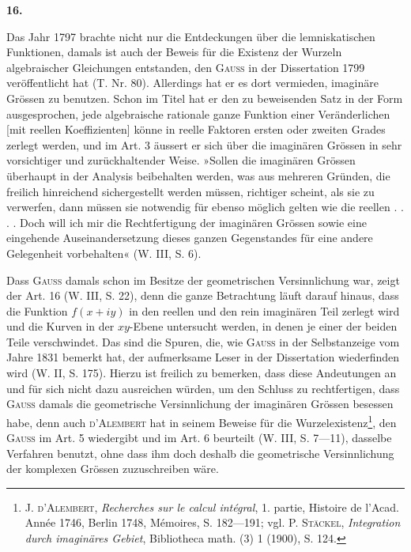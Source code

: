\clearpage\begingroup{}
\renewcommand{\thefootnote}{\arabic{footnote})}\setcounter{footnote}{0}
\begin{center}
\textbf{16.}\par\smallskip
{}
\end{center}
\noindent\hspace*{\parindent}Das Jahr 1797 brachte nicht nur die Entdeckungen über die lemniskatischen
Funktionen, damals ist auch der Beweis für die Existenz der Wurzeln
algebraischer Gleichungen entstanden, den \textsc{Gauss} in der Dissertation 1799
veröffentlicht hat (T. Nr. 80). Allerdings hat er es dort vermieden, imaginäre
Grössen zu benutzen. Schon im Titel hat er den zu beweisenden Satz in
der Form ausgesprochen, jede algebraische rationale ganze Funktion einer
Veränderlichen [mit reellen Koeffizienten] könne in reelle Faktoren ersten
oder zweiten Grades zerlegt werden, und im Art. 3 äussert er sich über die
imaginären Grössen in sehr vorsichtiger und zurückhaltender Weise. »Sollen
die imaginären Grössen überhaupt in der Analysis beibehalten werden, was
aus mehreren Gründen, die freilich hinreichend sichergestellt werden müssen,
richtiger scheint, als sie zu verwerfen, dann müssen sie notwendig für ebenso
möglich gelten wie die reellen . . . . Doch will ich mir die Rechtfertigung
der imaginären Grössen sowie eine eingehende Auseinandersetzung dieses ganzen
Gegenstandes für eine andere Gelegenheit vorbehalten« (W. III, S. 6).
\par
Dass \textsc{Gauss} damals schon im Besitze der geometrischen Versinnlichung
war, zeigt der Art. 16 (W. III, S. 22), denn die ganze Betrachtung läuft
darauf hinaus, dass die Funktion \(f(x+iy)\) in den reellen und den rein imaginären
Teil zerlegt wird und die Kurven in der \(xy\)-Ebene untersucht werden,
in denen je einer der beiden Teile verschwindet. Das sind die Spuren, die,
wie \textsc{Gauss} in der Selbstanzeige vom Jahre 1831 bemerkt hat, der aufmerksame
Leser in der Dissertation wiederfinden wird (W. II, S. 175). Hierzu ist freilich
zu bemerken, dass diese Andeutungen an und für sich nicht dazu ausreichen
würden, um den Schluss zu rechtfertigen, dass \textsc{Gauss} damals die geometrische
Versinnlichung der imaginären Grössen besessen habe, denn auch
\textsc{d’Alembert} hat in seinem Beweise für die Wurzelexistenz\footnote{J. \textsc{d’Alembert}, \textit{Recherches sur le calcul intégral}, 1. partie, Histoire de l’Acad. Année 1746, Berlin 1748, Mémoires, S. 182—191; vgl. P. \textsc{Stäckel}, \textit{Integration durch imaginäres Gebiet}, Bibliotheca math. (3) 1 (1900), S. 124.}, den \textsc{Gauss} im
\clearpage{}\setcounter{footnote}{0}
\noindent Art. 5 wiedergibt und im Art. 6 beurteilt (W. III, S. 7—11), dasselbe Verfahren
benutzt, ohne dass ihm doch deshalb die geometrische Versinnlichung
der komplexen Grössen zuzuschreiben wäre.
\clearpage\endgroup

